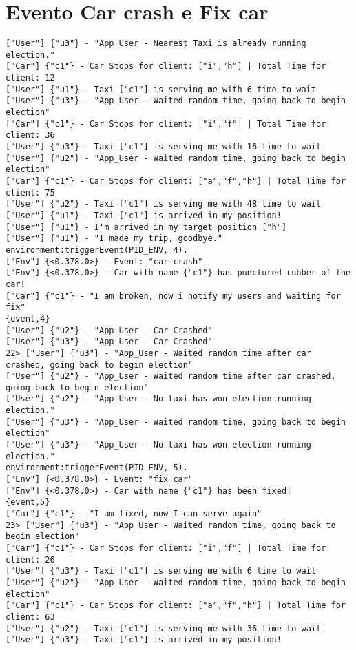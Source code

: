 \section{Evento Car crash e Fix car} \label{car_crash_fix_event}
\begin{lstlisting}
["User"] {"u3"} - "App_User - Nearest Taxi is already running election." 
["Car"] {"c1"} - Car Stops for client: ["i","h"] | Total Time for client: 12
["User"] {"u1"} - Taxi ["c1"] is serving me with 6 time to wait
["User"] {"u3"} - "App_User - Waited random time, going back to begin election" 
["Car"] {"c1"} - Car Stops for client: ["i","f"] | Total Time for client: 36
["User"] {"u3"} - Taxi ["c1"] is serving me with 16 time to wait
["User"] {"u2"} - "App_User - Waited random time, going back to begin election" 
["Car"] {"c1"} - Car Stops for client: ["a","f","h"] | Total Time for client: 75
["User"] {"u2"} - Taxi ["c1"] is serving me with 48 time to wait
["User"] {"u1"} - Taxi ["c1"] is arrived in my position!
["User"] {"u1"} - I'm arrived in my target position ["h"]
["User"] {"u1"} - "I made my trip, goodbye." 
environment:triggerEvent(PID_ENV, 4).
["Env"] {<0.378.0>} - Event: "car crash"
["Env"] {<0.378.0>} - Car with name {"c1"} has punctured rubber of the car!
["Car"] {"c1"} - "I am broken, now i notify my users and waiting for fix" 
{event,4}
["User"] {"u2"} - "App_User - Car Crashed" 
["User"] {"u3"} - "App_User - Car Crashed" 
22> ["User"] {"u3"} - "App_User - Waited random time after car crashed, going back to begin election" 
["User"] {"u2"} - "App_User - Waited random time after car crashed, going back to begin election" 
["User"] {"u2"} - "App_User - No taxi has won election running election." 
["User"] {"u3"} - "App_User - Waited random time, going back to begin election" 
["User"] {"u3"} - "App_User - No taxi has won election running election." 
environment:triggerEvent(PID_ENV, 5).
["Env"] {<0.378.0>} - Event: "fix car"
["Env"] {<0.378.0>} - Car with name {"c1"} has been fixed!
{event,5}
["Car"] {"c1"} - "I am fixed, now I can serve again" 
23> ["User"] {"u3"} - "App_User - Waited random time, going back to begin election" 
["Car"] {"c1"} - Car Stops for client: ["i","f"] | Total Time for client: 26
["User"] {"u3"} - Taxi ["c1"] is serving me with 6 time to wait
["User"] {"u2"} - "App_User - Waited random time, going back to begin election" 
["Car"] {"c1"} - Car Stops for client: ["a","f","h"] | Total Time for client: 63
["User"] {"u2"} - Taxi ["c1"] is serving me with 36 time to wait
["User"] {"u3"} - Taxi ["c1"] is arrived in my position!
\end{lstlisting}